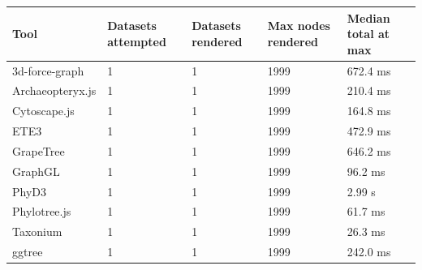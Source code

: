 \begin{tabular}{lllll}
\hline
Tool & Datasets attempted & Datasets rendered & Max nodes rendered & Median total at max \\
\hline
3d-force-graph & 1 & 1 & 1999 & 672.4 ms \\
Archaeopteryx.js & 1 & 1 & 1999 & 210.4 ms \\
Cytoscape.js & 1 & 1 & 1999 & 164.8 ms \\
ETE3 & 1 & 1 & 1999 & 472.9 ms \\
GrapeTree & 1 & 1 & 1999 & 646.2 ms \\
GraphGL & 1 & 1 & 1999 & 96.2 ms \\
PhyD3 & 1 & 1 & 1999 & 2.99 s \\
Phylotree.js & 1 & 1 & 1999 & 61.7 ms \\
Taxonium & 1 & 1 & 1999 & 26.3 ms \\
ggtree & 1 & 1 & 1999 & 242.0 ms \\
\hline
\end{tabular}
